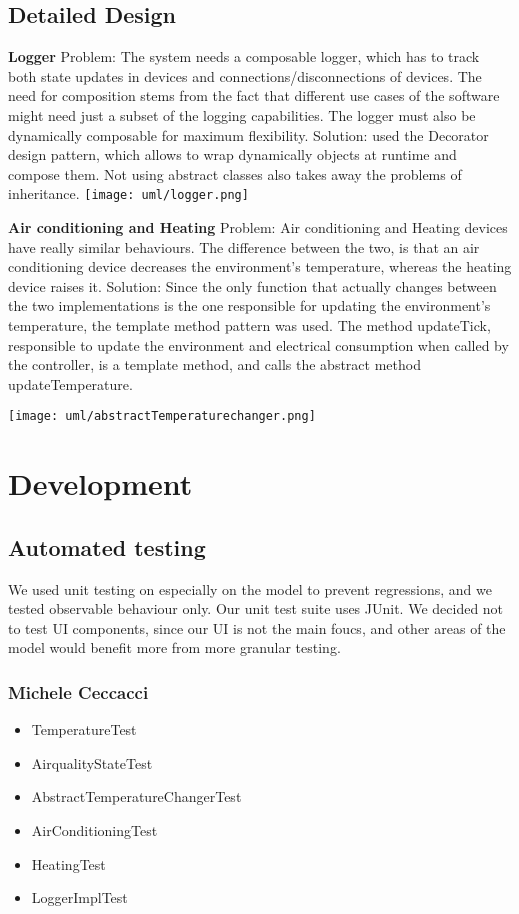 \documentclass[a4paper,12pt]{report}
\begin{document}
\section{Detailed Design}

\textbf{Logger} \newline
Problem: The system needs a composable logger, which has to track both state updates in devices and connections/disconnections
of devices. The need for composition stems from the fact that different use cases of the software might need just a subset
of the logging capabilities. The logger must also be dynamically composable for maximum flexibility.
Solution: used the Decorator design pattern, which allows to wrap dynamically objects at runtime and compose them.
Not using abstract classes also takes away the problems of inheritance.
\texttt{[image: uml/logger.png]}

\textbf{Air conditioning and Heating}\newline
Problem: 
Air conditioning and Heating devices have really similar behaviours. The difference between the two, is that an air conditioning
device decreases the environment's temperature, whereas the heating device raises it.
Solution: Since the only function that actually changes between the two implementations is the one responsible for updating the
environment's temperature, the template method pattern was used. 
The method updateTick, responsible to update the environment and electrical consumption when called by the controller,
is a template method, and calls the abstract method updateTemperature.

\texttt{[image: uml/abstractTemperaturechanger.png]}


\chapter{Development}
\section{Automated testing}
We used unit testing on especially on the model to prevent regressions, and we tested observable behaviour only.
Our unit test suite uses JUnit.
We decided not to test UI components, since our UI is not the main foucs,
and other areas of the model would benefit more from more granular testing. 

\subsection{Michele Ceccacci}
\begin{itemize}
	\item TemperatureTest
	\item AirqualityStateTest
	\item AbstractTemperatureChangerTest
	\item AirConditioningTest
	\item  HeatingTest
	\item LoggerImplTest
\end{itemize}
\end{document}
